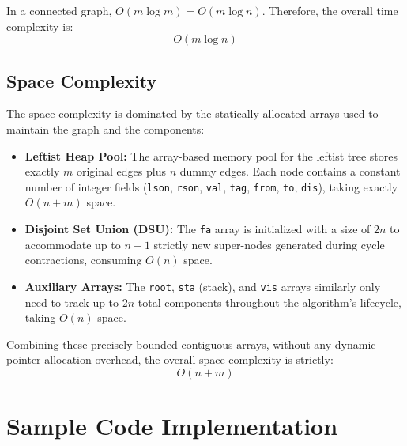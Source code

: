 \documentclass[UTF8, a4paper]{article}
\theoremstyle{definition}
\begin{document}
In a connected graph, $O(m \log m) = O(m \log n)$. Therefore, the overall time complexity is:
\[
\boxed{O(m \log n)}
\]

\subsection{Space Complexity}

The space complexity is dominated by the statically allocated arrays used to maintain the graph and the components:
\begin{itemize}
    \item \textbf{Leftist Heap Pool:} The array-based memory pool for the leftist tree stores exactly $m$ original edges plus $n$ dummy edges. Each node contains a constant number of integer fields (\texttt{lson}, \texttt{rson}, \texttt{val}, \texttt{tag}, \texttt{from}, \texttt{to}, \texttt{dis}), taking exactly $O(n + m)$ space.
    \item \textbf{Disjoint Set Union (DSU):} The \texttt{fa} array is initialized with a size of $2n$ to accommodate up to $n-1$ strictly new super-nodes generated during cycle contractions, consuming $O(n)$ space.
    \item \textbf{Auxiliary Arrays:} The \texttt{root}, \texttt{sta} (stack), and \texttt{vis} arrays similarly only need to track up to $2n$ total components throughout the algorithm's lifecycle, taking $O(n)$ space.
\end{itemize}

Combining these precisely bounded contiguous arrays, without any dynamic pointer allocation overhead, the overall space complexity is strictly:
\[
\boxed{O(n + m)}
\]

\appendix 

\section{Sample Code Implementation}
\end{document}
